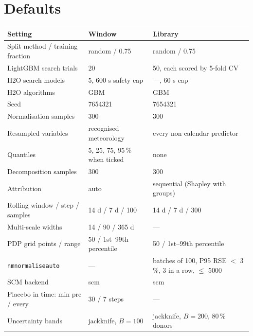 \documentclass[11pt]{report}
\newcommand{\codeunderscore}{\textunderscore\allowbreak}
\newcommand{\code}[1]{\texttt{\let\_\codeunderscore #1}}
\begin{document}
\chapter{Defaults}\label{app:defaults}
\begin{center}\small
\begin{longtable}{@{}p{4.9cm}p{4.3cm}p{5.8cm}@{}}
\toprule
Setting & Window & Library \\
\midrule
\endhead
Split method / training fraction & random / 0.75 & random / 0.75 \\
LightGBM search trials         & 20 & 50, each scored by 5-fold CV \\
H2O search models              & 5, 600 s safety cap & ---, 60 s cap \\
H2O algorithms                 & GBM & GBM \\
Seed                           & 7654321 & 7654321 \\
Normalisation samples          & 300 & 300 \\
Resampled variables            & recognised meteorology & every non-calendar predictor \\
Quantiles                      & 5, 25, 75, 95\,\% when ticked & none \\
Decomposition samples          & 300 & 300 \\
Attribution                    & auto & sequential (Shapley with groups) \\
Rolling window / step / samples & 14 d / 7 d / 100 & 14 d / 7 d / 300 \\
Multi-scale widths             & 14 / 90 / 365 d & --- \\
PDP grid points / range        & 50 / 1st--99th percentile & 50 / 1st--99th percentile \\
\code{nm\_normalise\_auto}       & --- & batches of 100, P95 RSE $<$ 3\,\%, 3 in a row, $\le$ 5000 \\
SCM backend                    & scm & scm \\
Placebo in time: min pre / every & 30 / 7 steps & --- \\
Uncertainty bands              & jackknife, $B = 100$ & jackknife, $B = 200$, 80\,\% donors \\
\bottomrule
\end{longtable}
\end{center}
\end{document}
